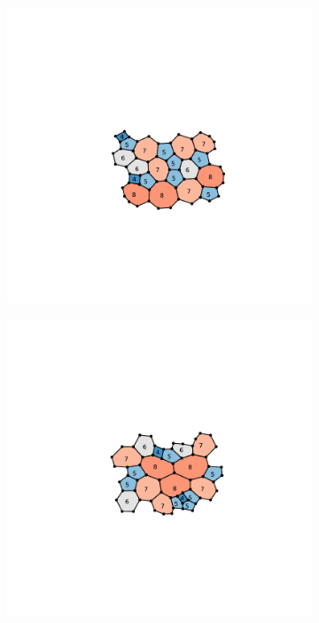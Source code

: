 \begin{figure}[h]
     \begin{subfigure}[b]{0.25\textwidth}
         \centering
         \includegraphics[width=\textwidth]{./figures/introduction/zach_mid.pdf}
         \caption{}
     \end{subfigure}
     \hspace{1cm}
     \begin{subfigure}[b]{0.25\textwidth}
         \centering
         \includegraphics[width=\textwidth]{./figures/introduction/zach_low.pdf}
         \caption{}
         \label{fig:zach_low}
     \end{subfigure}
     

\end{figure}
